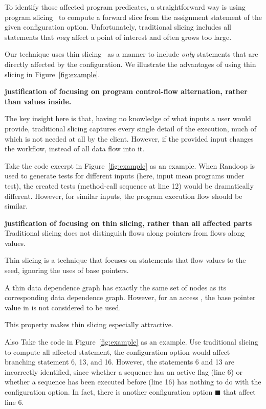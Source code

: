 To identify those affected program predicates, a straightforward way is using program
slicing~\cite{Horwitz:1988:ISU} to compute a forward slice from the assignment statement of the given
configuration option. Unfortunately, traditional slicing includes all statements that
\textit{may} affect a point of interest and often grows too large.

Our technique uses thin slicing~\cite{Sridharan:2007} as a manner to include
\textit{only} statements that are directly affected by the configuration.
We illustrate the advantages of using thin slicing 
 in Figure~\ref{fig:example}.





\textbf{justification of focusing on program control-flow
alternation, rather than values inside.}

The key insight here is that, having no knowledge of
what inputs a user would provide, traditional slicing
captures every single detail of the execution, much
of which is not needed at all by the client.
However, if the provided input changes the workflow,
instead of all data flow into it. 

Take the code excerpt in Figure~\ref{fig:example} as an example.
When Randoop is used to generate tests for different inputs (here,
input mean programs under test), the created tests (method-call
sequence at line 12) would be dramatically different.
However, for similar inputs, the program execution flow should
be similar.

\textbf{justification of focusing on thin slicing, rather
than all affected parts}
Traditional slicing does not distinguish flows along
pointers from flows along values.

Thin slicing is a technique that focuses on statements
that flow values to the seed, ignoring the uses of
base pointers.

A thin data dependence graph has exactly
the same set of nodes as its corresponding data dependence
graph. However, for an access , the base pointer value
in  is not considered to be used. 

This property makes thin slicing
especially attractive.

Also Take the code in Figure~\ref{fig:example} as an example.
Use traditional slicing to compute all affected statement,
the configuration option  would affect
branching statement 6, 13, and 16. However, the
statements 6 and 13 are incorrectly identified, since
whether a sequence has an active flag (line 6) or
whether a sequence has been executed before (line 16)
has nothing to do with the  configuration option.
In fact, there is another configuration option $\blacksquare$
that affect line 6.

